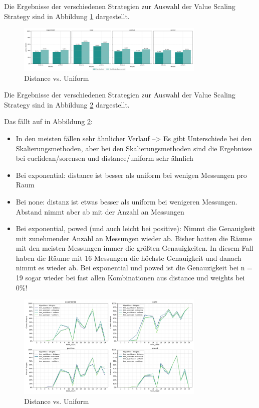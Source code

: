 Die Ergebnisse der verschiedenen Strategien zur Auswahl der Value Scaling Strategy sind in Abbildung \ref{fig:7_value_scaling_strategy_knn_distance_02} dargestellt.

\begin{figure}[H]
    \centering
    \includegraphics[width=0.8\textwidth]{images/7_value_scaling_strategy_knn_distance_02.png}
    \caption{Distance vs. Uniform}
    \label{fig:7_value_scaling_strategy_knn_distance_02}
\end{figure}

Die Ergebnisse der verschiedenen Strategien zur Auswahl der Value Scaling Strategy sind in Abbildung \ref{fig:7_value_scaling_strategy_knn_distance_03} dargestellt.

Das fällt auf in Abbildung \ref{fig:7_value_scaling_strategy_knn_distance_03}:
\begin{itemize}
    \item In den meisten fällen sehr ähnlicher Verlauf --> Es gibt Unterschiede bei den Skalierungsmethoden, aber bei den Skalierungsmethoden sind die Ergebnisse bei euclidean/sorensen und distance/uniform sehr ähnlich
    \item Bei exponential: distance ist besser als uniform bei wenigen Messungen pro Raum
    \item Bei none: distanz ist etwas besser als uniform bei wenigeren Messungen. Abstand nimmt aber ab mit der Anzahl an Messungen
    \item Bei exponential, powed (und auch leicht bei positive): Nimmt die Genauigkeit mit zunehmender Anzahl an Messungen wieder ab. Bisher hatten die Räume mit den meisten Messungen immer die größten Genauigkeiten. In diesem Fall haben die Räume mit 16 Messungen die höchste Genauigkeit und danach nimmt es wieder ab. Bei exponential und powed ist die Genauzigkeit bei n = 19 sogar wieder bei fast allen Kombinationen aus distance und weights bei 0\%!
\end{itemize}    

\begin{figure}[H]
    \centering
    \includegraphics[width=0.8\textwidth]{images/7_value_scaling_strategy_knn_distance_03.png}
    \caption{Distance vs. Uniform}
    \label{fig:7_value_scaling_strategy_knn_distance_03}
\end{figure}



